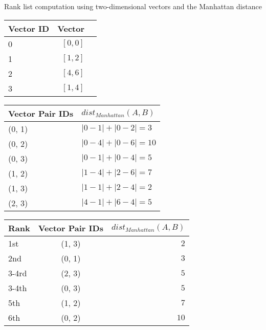 \begin{example}
  \centering
  \caption{Rank list computation using two-dimensional vectors and the Manhattan distance}
  \label{ex:rank_list}

  \begin{subexample}{\linewidth}
    \centering
    \begin{tabular}{l r r}
      \toprule
      Vector ID & Vector \\
      \midrule
      0 & $[0, 0]$ \\
      1 & $[1, 2]$ \\
      2 & $[4, 6]$ \\
      3 & $[1, 4]$ \\
      \bottomrule
    \end{tabular}
  \end{subexample}

  \vspace{0.5cm}

  \begin{subexample}{\linewidth}
    \centering
    \begin{tabular}{l l}
      \toprule
      Vector Pair IDs & $dist_{Manhattan}(A, B)$ \\
      \midrule
      (0, 1) & $|0-1| + |0-2| = 3$ \\
      (0, 2) & $|0-4| + |0-6| = 10$ \\
      (0, 3) & $|0-1| + |0-4| = 5$ \\
      (1, 2) & $|1-4| + |2-6| = 7$ \\
      (1, 3) & $|1-1| + |2-4| = 2$ \\
      (2, 3) & $|4-1| + |6-4| = 5$ \\
      \bottomrule
    \end{tabular}
  \end{subexample}

  \vspace{0.5cm}

  \begin{subexample}{\linewidth}
    \centering
    \begin{tabular}{l c r}
      \toprule
      Rank & Vector Pair IDs & $dist_{Manhattan}(A, B)$ \\
      \midrule
      1st   & (1, 3) & $2$ \\
      2nd   & (0, 1) & $3$ \\
      3-4rd & (2, 3) & $5$ \\
      3-4th & (0, 3) & $5$ \\
      5th   & (1, 2) & $7$ \\
      6th   & (0, 2) & $10$ \\
      \bottomrule
    \end{tabular}
  \end{subexample}
\end{example}

